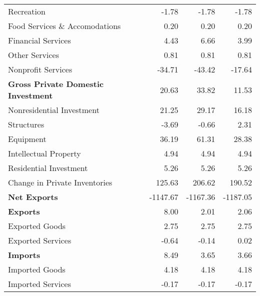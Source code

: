 \documentclass[11pt, letterpaper]{article}\usepackage[]{graphicx}\usepackage[]{color}
\begin{document}
\begin{table}[H]
\begin{tabular}{lrrr}
  \hspace{16mm}  Recreation & -1.78 & -1.78 & -1.78 \\ 
  \hspace{16mm}  Food Services \& Accomodations & 0.20 & 0.20 & 0.20 \\ 
  \hspace{16mm}  Financial Services & 4.43 & 6.66 & 3.99 \\ 
  \hspace{16mm}  Other Services & 0.81 & 0.81 & 0.81 \\ 
  \hspace{16mm}  Nonprofit Services & -34.71 & -43.42 & -17.64 \\ 
  \hspace{0mm} \textbf{Gross Private Domestic Investment} & 20.63 & 33.82 & 11.53 \\ 
  \hspace{8mm}  Nonresidential Investment & 21.25 & 29.17 & 16.18 \\ 
  \hspace{16mm}  Structures & -3.69 & -0.66 & 2.31 \\ 
  \hspace{16mm}  Equipment & 36.19 & 61.31 & 28.38 \\ 
  \hspace{16mm}  Intellectual Property & 4.94 & 4.94 & 4.94 \\ 
  \hspace{8mm}  Residential Investment & 5.26 & 5.26 & 5.26 \\ 
  \hspace{8mm}  Change in Private Inventories & 125.63 & 206.62 & 190.52 \\ 
  \hspace{0mm} \textbf{Net Exports} & -1147.67 & -1167.36 & -1187.05 \\ 
  \hspace{0mm} \textbf{Exports} & 8.00 & 2.01 & 2.06 \\ 
  \hspace{8mm}  Exported Goods & 2.75 & 2.75 & 2.75 \\ 
  \hspace{8mm}  Exported Services & -0.64 & -0.14 & 0.02 \\ 
  \hspace{0mm} \textbf{Imports} & 8.49 & 3.65 & 3.66 \\ 
  \hspace{8mm}  Imported Goods & 4.18 & 4.18 & 4.18 \\ 
  \hspace{8mm}  Imported Services & -0.17 & -0.17 & -0.17 \\ 

\end{tabular}
\end{table}
\end{document}
